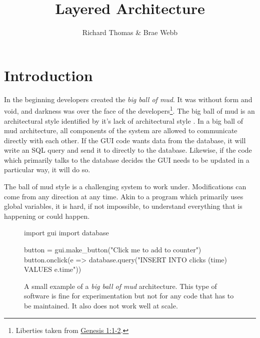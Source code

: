 \title{Layered Architecture}
\author{Richard Thomas \& Brae Webb}
\date{}

\maketitle

\section{Introduction}
In the beginning developers created the \textit{big ball of mud}.
It was without form and void, and darkness was over the face of the developers\footnote{Liberties taken from
\href{https://www.biblegateway.com/passage/?search=gen+1\&version=ESV}{Genesis 1:1-2}.}.
The big ball of mud is an architectural style identified by it's lack of architectural style \cite{ballofmud}.
In a big ball of mud architecture, all components of the system are allowed to communicate directly with each other.
If the GUI code wants data from the database, it will write an SQL query and send it to directly to the database.
Likewise, if the code which primarily talks to the database decides the GUI needs to be updated in a particular way, it will do so.

The ball of mud style is a challenging system to work under.
Modifications can come from any direction at any time.
Akin to a program which primarily uses global variables,
it is hard, if not impossible,
to understand everything that is happening or could happen.


\begin{figure}[ht]
\begin{code}[style=python]{}
import gui
import database

button = gui.make_button("Click me to add to counter")
button.onclick(e => 
    database.query("INSERT INTO clicks (time) VALUES {{e.time}}"))
\end{code}
\caption{
A small example of a \textsl{big ball of mud} architecture.
This type of software is fine for experimentation
but not for any code that has to be maintained.
It also does not work well at scale.
}
\end{figure}

